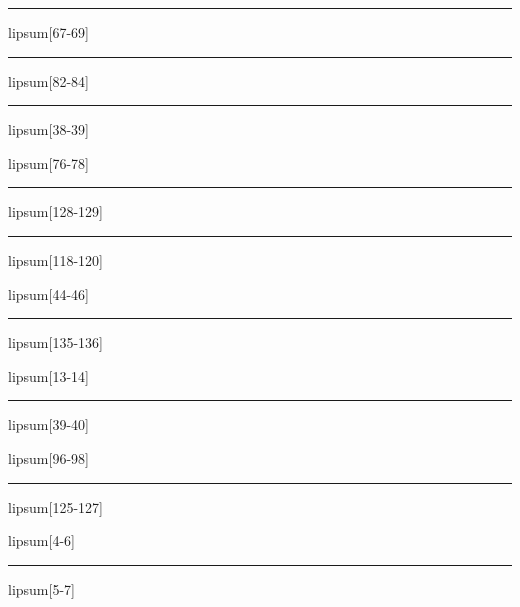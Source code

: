 \documentclass[11pt,a4paper]{article}
\begin{document}
\begin{simplewrap}
  \textcolor{violet!34}{\rule{4.4cm}{7.2cm}}
\end{simplewrap}
lipsum[67-69]

\begin{simplewrap}
  \textcolor{red!39}{\rule{3.3cm}{9.9cm}}
\end{simplewrap}
lipsum[82-84]

\begin{simplewrap}
  \textcolor{lime!30}{\rule{4.2cm}{6.5cm}}
\end{simplewrap}
lipsum[38-39]

lipsum[76-78]

\begin{simplewrap}
  \textcolor{purple!22}{\rule{4.0cm}{5.0cm}}
\end{simplewrap}
lipsum[128-129]

\begin{simplewrap}
  \textcolor{brown!26}{\rule{5.3cm}{5.9cm}}
\end{simplewrap}
lipsum[118-120]

lipsum[44-46]

\begin{simplewrap}
  \textcolor{purple!56}{\rule{4.6cm}{3.5cm}}
\end{simplewrap}
lipsum[135-136]

lipsum[13-14]

\begin{simplewrap}
  \textcolor{red!36}{\rule{3.4cm}{7.0cm}}
\end{simplewrap}
lipsum[39-40]

lipsum[96-98]

\begin{simplewrap}
  \textcolor{blue!49}{\rule{4.9cm}{9.5cm}}
\end{simplewrap}
lipsum[125-127]

lipsum[4-6]

\begin{simplewrap}
  \textcolor{red!43}{\rule{5.2cm}{6.3cm}}
\end{simplewrap}
lipsum[5-7]
\end{document}
